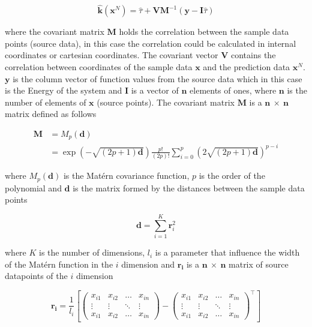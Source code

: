 \documentclass[aps,prb,twocolumn,superscriptaddress,floatfix,longbibliography,10pt]{revtex4-2}
\begin{document}
\begin{equation} \label{eqn:kriging}
\mathbf{\hat{k}}(\mathbf{x}^N) =  \hat{\tau} + \mathbf{V} \mathbf{M}^{-1}(\mathbf{y} - \mathbf{I}\hat{\tau})
\end{equation}

where the covariant matrix $\mathbf{M}$ holds the correlation between the sample data points (source data), in this case the correlation could be calculated in internal coordinates  or cartesian coordinates. The covariant  vector $\mathbf{V}$ contains the correlation between coordinates of the sample data $\mathbf{x}$ and the prediction data $\mathbf{x}^N$. $\mathbf{y}$ is the column vector of function values from the source data which in this case is the Energy of the system and $\mathbf{I}$ is a vector of $\mathbf{n}$ elements of ones, where $\mathbf{n}$ is the number of elements of $\mathbf{x}$ (source points). 
The covariant matrix $\mathbf{M}$ is a $\mathbf{n}\: \times \: \mathbf{n}$ matrix defined as follows 

\begin{equation} \label{eqn:covmatrix}
\begin{split}
\mathbf{M} & =  M_{p}(\mathbf{d}) \\
& = \exp{\left(-\sqrt{(2p+1)\mathbf{d}}\right)}\frac{p!}{(2p)!}\sum^p_{i=0}\left(2\sqrt{(2p+1)\mathbf{d}}\right)^{p-i}
\end{split}
\end{equation}

where $M_{p}(\mathbf{d})$ is the Mat\'ern covariance function\cite{Stein2019}, $p$ is the order of the polynomial and $\mathbf{d}$ is the matrix formed by the distances between the sample data points 

\begin{equation} \label{eqn:dpmatrix}
\mathbf{d} = \sum^K_{i=1}\mathbf{r}_i^2
\end{equation}

where $K$ is the number of dimensions, $l_i$ is a parameter that influence the width of the Mat\'ern function in the $i$ dimension and $\mathbf{r_i}$ is a $\mathbf{n}\: \times \: \mathbf{n}$ matrix of source datapoints of the $i$ dimension

\begin{equation} \label{eqn:xdata}
\mathbf{r_i} = \frac{1}{l_i}\left[
\begin{pmatrix}
x_{i1} & x_{i2} & \dots  & x_{in} \\
\vdots & \vdots & \ddots & \vdots \\
x_{i1} & x_{i2} & \dots  & x_{in}
\end{pmatrix}
-
\begin{pmatrix}
x_{i1} & x_{i2} & \dots  & x_{in} \\
\vdots & \vdots & \ddots & \vdots \\
x_{i1} & x_{i2} & \dots  & x_{in}
\end{pmatrix}^\intercal
\right]
\end{equation}
\end{document}
